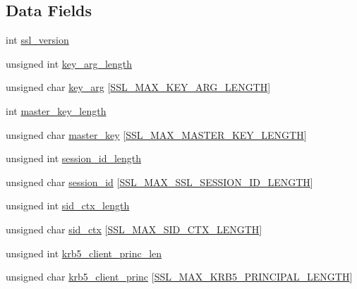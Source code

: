 \subsection*{Data Fields}
\begin{DoxyCompactItemize}
\item 
int \hyperlink{structssl__session__st_afa8ac686c24cccdad35d84634389fec4}{ssl\+\_\+version}
\item 
unsigned int \hyperlink{structssl__session__st_a8c4b7eb8b3c4895e5e040af8ada2ac31}{key\+\_\+arg\+\_\+length}
\item 
unsigned char \hyperlink{structssl__session__st_a48cd97797044482ffeaf982ed5063f4e}{key\+\_\+arg} \mbox{[}\hyperlink{ssl_2ssl_8h_abdf756f947260a71d7b7eebc332f6171}{S\+S\+L\+\_\+\+M\+A\+X\+\_\+\+K\+E\+Y\+\_\+\+A\+R\+G\+\_\+\+L\+E\+N\+G\+TH}\mbox{]}
\item 
int \hyperlink{structssl__session__st_a08ec86f97ed09aeaf918125774ab1aaf}{master\+\_\+key\+\_\+length}
\item 
unsigned char \hyperlink{structssl__session__st_ae99fe67c2b9ff3a33e0360421df12f34}{master\+\_\+key} \mbox{[}\hyperlink{ssl_2ssl_8h_ab96c69cdc3051de20ca9bb157d790f4a}{S\+S\+L\+\_\+\+M\+A\+X\+\_\+\+M\+A\+S\+T\+E\+R\+\_\+\+K\+E\+Y\+\_\+\+L\+E\+N\+G\+TH}\mbox{]}
\item 
unsigned int \hyperlink{structssl__session__st_aef3d2a4622055ed0cfb19d9d8f696ec2}{session\+\_\+id\+\_\+length}
\item 
unsigned char \hyperlink{structssl__session__st_a804836bd30ce64884deba8fb65507fb0}{session\+\_\+id} \mbox{[}\hyperlink{ssl_2ssl_8h_a918194c29290f107e9440a722af9c2c6}{S\+S\+L\+\_\+\+M\+A\+X\+\_\+\+S\+S\+L\+\_\+\+S\+E\+S\+S\+I\+O\+N\+\_\+\+I\+D\+\_\+\+L\+E\+N\+G\+TH}\mbox{]}
\item 
unsigned int \hyperlink{structssl__session__st_a924f0b0c8d0e6c35bac8a124589df9c2}{sid\+\_\+ctx\+\_\+length}
\item 
unsigned char \hyperlink{structssl__session__st_a26dc95db49d98798375078f7c1653ba4}{sid\+\_\+ctx} \mbox{[}\hyperlink{ssl_2ssl_8h_a5cef804495c6414283f4f29d4cea0dd0}{S\+S\+L\+\_\+\+M\+A\+X\+\_\+\+S\+I\+D\+\_\+\+C\+T\+X\+\_\+\+L\+E\+N\+G\+TH}\mbox{]}
\item 
unsigned int \hyperlink{structssl__session__st_aee332e95f309ecc64b24bc19dacf0720}{krb5\+\_\+client\+\_\+princ\+\_\+len}
\item 
unsigned char \hyperlink{structssl__session__st_a63d257c18a0be317dc0462a8dec251c8}{krb5\+\_\+client\+\_\+princ} \mbox{[}\hyperlink{ssl_2ssl_8h_a769b01678d30390799d7c78fb8c9859f}{S\+S\+L\+\_\+\+M\+A\+X\+\_\+\+K\+R\+B5\+\_\+\+P\+R\+I\+N\+C\+I\+P\+A\+L\+\_\+\+L\+E\+N\+G\+TH}\mbox{]}

\end{DoxyCompactItemize}
